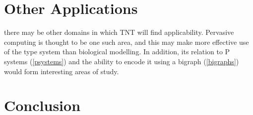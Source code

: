 \section{Other Applications}
there may
be other domains in which TNT will find applicability.  Pervasive
computing is thought to be one such area, and this may make more
effective use of the type system than biological modelling.  In
addition, its relation to P systems (\ref{psystems}) and the ability to
encode it using a bigraph (\ref{bigraphs}) would form interesting areas
of study.

\section{Conclusion}
